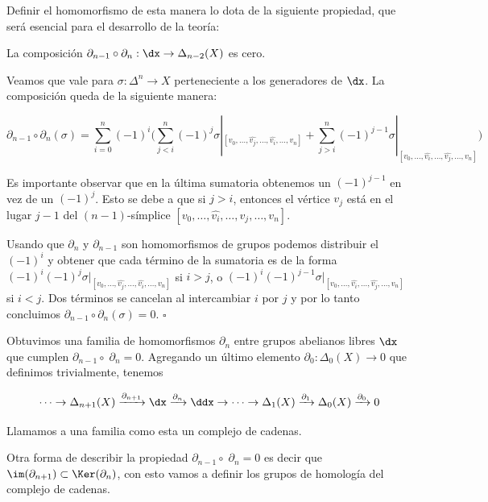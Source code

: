 Definir el homomorfismo de esta manera lo dota de la siguiente propiedad, que será esencial para el desarrollo de la teoría:

\begin{lema}
La composición $\partial_{n-1}\circ\partial_n :\dx\to \Delta_{n-2}(X)$ es cero.
\end{lema}

\begin{dem}
Veamos que vale para $\sigma:\Delta^n\to X$ perteneciente a los generadores de $\dx$. La composición queda de la siguiente manera: 

$$\partial_{n-1}\circ\partial_n(\sigma)=\sum\limits_{i=0}^n(-1)^i\bigg(\sum\limits_{j<i}^n (-1)^j\sigma|_{[v_0,\dots,\hat{v_j},\dots,\hat{v_i},\dots,v_n]} + \sum\limits_{j>i}^n (-1)^{j-1}\sigma|_{[v_0,\dots,\hat{v_i},\dots,\hat{v_j},\dots,v_n]}\bigg)$$

Es importante observar que en la última sumatoria obtenemos un $(-1)^{j-1}$ en vez de un $(-1)^j$. Esto se debe a que si $j>i$, entonces el vértice $v_j$ está en el lugar $j-1$ del $(n-1)$-símplice $[v_0,\dots,\hat{v_i},\dots,v_j,\dots, v_n]$.

Usando que $\partial_n$ y $\partial_{n-1}$ son homomorfismos de grupos podemos distribuir el $(-1)^i$ y obtener que cada término de la sumatoria es de la forma $(-1)^i(-1)^j\sigma|_{[v_0,\dots,\hat{v_j},\dots,\hat{v_i},\dots,v_n]}$ si $i>j$, o $(-1)^i(-1)^{j-1}\sigma|_{[v_0,\dots,\hat{v_i},\dots,\hat{v_j},\dots,v_n]}$ si $i<j$. Dos términos se cancelan al intercambiar $i$ por $j$ y por lo tanto concluimos $\partial_{n-1}\circ\partial_n(\sigma)=0$. $\square$

\end{dem}

\begin{df}
    
Obtuvimos una familia de homomorfismos $\partial_n$ entre grupos abelianos libres $\dx$ que cumplen $\partial_{n-1}\circ\;\partial_n= 0$. Agregando un último elemento $\partial_0:\Delta_0(X)\to 0$ que definimos trivialmente, tenemos 

$$\dots\rightarrow \Delta_{n+1}(X)\xrightarrow{\partial_{n+1}}\dx\xrightarrow{\partial_n}\ddx\rightarrow\dots\rightarrow\Delta_{1}(X)\xrightarrow{\partial_1}\Delta_{0}(X)\xrightarrow{\partial_0} 0$$\br

Llamamos a una familia como esta un complejo de cadenas.

\end{df}\br

Otra forma de describir la propiedad $\partial_{n-1}\circ\;\partial_n=0$ es decir que $\im(\partial_{n+1})\subset\Ker(\partial_n)$, con esto vamos a definir los grupos de homología del complejo de cadenas.\br

